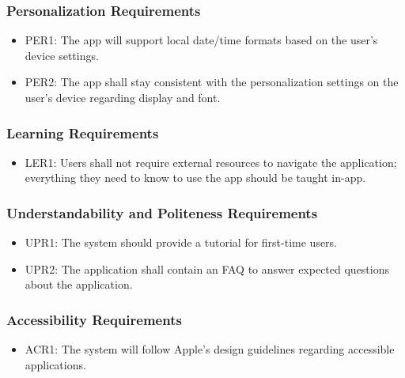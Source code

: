 \documentclass[12pt]{article}
\begin{document}
\subsubsection{Personalization Requirements}
\begin{itemize}
\item PER1: The app will support local date/time formats based on the user’s device settings.
\item PER2: The app shall stay consistent with the personalization settings on the user’s device regarding display and font.
\end{itemize}

\subsubsection{Learning Requirements}
\begin{itemize}
\item LER1: Users shall not require external resources to navigate the application; everything they need to know to use the app should be taught in-app.
\end{itemize}

\subsubsection{Understandability and Politeness Requirements}
\begin{itemize}
\item UPR1: The system should provide a tutorial for first-time users.
\item UPR2: The application shall contain an FAQ to answer expected questions about the application.
\end{itemize}

\subsubsection{Accessibility Requirements}
\begin{itemize}
\item ACR1: The system will follow Apple’s design guidelines regarding accessible applications.
\end{itemize}
\end{document}
